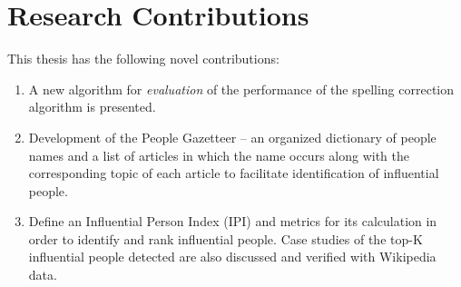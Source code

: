 \section{Research Contributions}
This thesis has the following novel contributions:
\begin{enumerate}
\item A new algorithm for \emph{evaluation} of the performance of the spelling correction algorithm is presented. 
\item Development of the People Gazetteer -- an organized  dictionary of people names and a list of articles in which the name occurs along with the corresponding topic of each article to facilitate identification of influential people.
\item Define an Influential Person Index (IPI) and metrics for its calculation in order to identify and rank influential people. Case studies of the top-K influential people detected are also discussed and verified with Wikipedia data. 

\end{enumerate}


